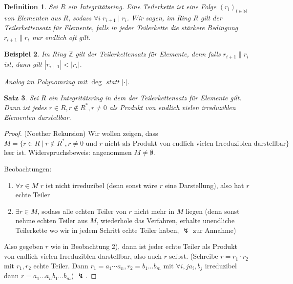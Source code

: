 \documentclass[a4paper,12pt,numbers=noenddot,parskip=full]{scrartcl}
\newcommand{\setN}{\mathbb{N}}
\newcommand{\setZ}{\mathbb{Z}}
\newcommand{\abs}[1]{{\left| #1 \right|}}
\theoremstyle{dotless}
\newtheorem{theorem}{Satz}[section]
\newtheorem{definition}[theorem]{Definition}
\newtheorem{example}[theorem]{Beispiel}
\theoremstyle{remark}
\begin{document}
 	\begin{definition}
 		Sei $R$ ein Integritätsring. Eine Teilerkette ist eine Folge $(r_i)_{i \in \setN}$ von Elementen aus $R$, sodass $\forall i \; r_{i+1} \mid r_i$. Wir sagen, im Ring $R$ gilt der Teilerkettensatz für Elemente, falls in jeder Teilerkette die stärkere Bedingung $r_{i+1} \parallel r_i$ nur endlich oft gilt.
 	\end{definition}
 
 	\begin{example}
 		Im Ring $\setZ$ gilt der Teilerkettensatz für Elemente, denn falls $r_{i+1} \parallel r_i$ ist, dann gilt $\abs{r_{i+1}} < \abs{r_i}$.
 		
 		Analog im Polynomring mit $\deg$ statt $\abs{\cdot}$.
 	\end{example}
 
 	\begin{theorem}
 		Sei $R$ ein Integritätsring in dem der Teilerkettensatz für Elemente gilt. Dann ist jedes $r \in R, r \notin R^*, r \neq 0$ als Produkt von endlich vielen irreduziblen Elementen darstellbar.
 	\end{theorem}
 
 	\begin{proof}(Noether Rekursion)
 		Wir wollen zeigen, dass $M = \{ r \in R \mid r \notin R^*, r \neq 0 \text{ und $r$ nicht als Produkt von endlich vielen Irreduziblen darstellbar} \}$ leer ist. Widerspruchsbeweis: angenommen $M \neq \emptyset$.
 		
 		Beobachtungen:
 		\begin{enumerate}
 			\item $\forall r \in M$ $r$ ist nicht irreduzibel (denn sonst wäre $r$ eine Darstellung), also hat $r$ echte Teiler
 			\item $\exists r \in M$, sodass alle echten Teiler von $r$ nicht mehr in $M$ liegen (denn sonst nehme echten Teiler aus $M$, wiederhole das Verfahren, erhalte unendliche Teilerkette wo wir in jedem Schritt echte Teiler haben, $\lightning$ zur Annahme)
 		\end{enumerate}
 	
 		Also gegeben $r$ wie in Beobachtung 2), dann ist jeder echte Teiler als Produkt von endlich vielen Irreduziblen darstellbar, also auch $r$ selbst. (Schreibe $r = r_1 \cdot r_2$ mit $r_1, r_2$ echte Teiler. Dann $r_1 = a_1 \cdots a_n, r_2 = b_1 \dots b_m$ mit $\forall i,j a_i, b_j$ irreduzibel dann $r = a_1 \dots a_n b_1 \dots b_m$) $\lightning$.
 	\end{proof}
 
\end{document}
